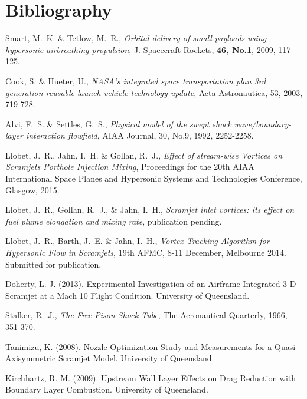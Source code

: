 \documentclass{AIAA}
\begin{document}
\section{Bibliography}

\begin{thebibliography}{}

Smart, M.~K. \& Tetlow, M.~R., {\it Orbital delivery of small payloads using hypersonic airbreathing propulsion}, J. Spacecraft Rockets, {\bf 46, No.1}, 2009, 117-125.

Cook, S. \& Hueter, U., {\it NASA's integrated space transportation plan 3rd generation reusable launch vehicle technology update}, Acta Astronautica, 53, 2003, 719-728.

Alvi, F.~S. \& Settles, G.~S., {\it Physical model of the swept shock wave/boundary-layer interaction flowfield}, AIAA Journal, 30, No.9, 1992, 2252-2258.

Llobet, J.~R., Jahn, I.~H. \& Gollan, R.~J., {\it Effect of stream-wise Vortices on Scramjets Porthole Injection Mixing}, Proceedings for the 20th AIAA International Space Planes and Hypersonic Systems and Technologies Conference, Glasgow, 2015. 

Llobet, J.~R., Gollan, R.~J., \& Jahn, I.~H., {\it Scramjet inlet vortices: its effect on fuel plume elongation and mixing rate}, publication pending.

Llobet, J.~R., Barth, J.~E. \& Jahn, I.~H., {\it Vortex Tracking Algorithm for Hypersonic Flow in Scramjets}, 19th AFMC, 8-11 December, Melbourne 2014. Submitted for publication.

Doherty, L. J. (2013). Experimental Investigation of an Airframe Integrated 3-D Scramjet at a Mach 10 Flight Condition. University of Queensland.

Stalker, R~.J., {\it The Free-Pison Shock Tube}, The Aeronautical Quarterly, 1966, 351-370.

Tanimizu, K. (2008). Nozzle Optimization Study and Measurements for a Quasi-Axisymmetric Scramjet Model. University of Queensland.

Kirchhartz, R. M. (2009). Upstream Wall Layer Effects on Drag Reduction with Boundary Layer Combustion. University of Queensland.


\end{thebibliography}
\end{document}
